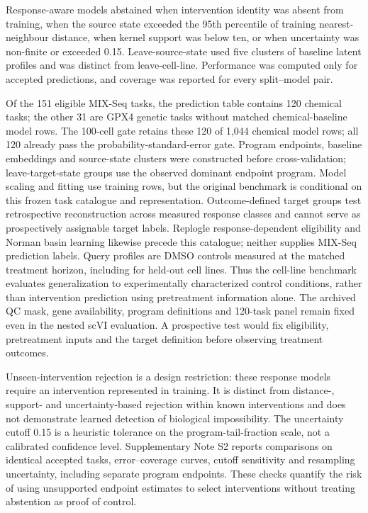 \documentclass[a4paper,fleqn]{cas-sc}
\makeatletter
\DeclareRobustCommand{\rev}[1]{{\color{red}\def\@citecolor{black}\def\@linkcolor{red}\def\@urlcolor{red}#1}}
\makeatother
\begin{document}
Response-aware models abstained when intervention identity was absent from training, when the source state exceeded the 95th percentile of training nearest-neighbour distance, when kernel support was below ten, or when uncertainty was non-finite or exceeded 0.15. Leave-source-state used five clusters of baseline latent profiles and was distinct from leave-cell-line. Performance was computed only for accepted predictions, and coverage was reported for every split--model pair.

Of the 151 eligible MIX-Seq tasks, the prediction table contains 120 chemical tasks; the other 31 are GPX4 genetic tasks without matched chemical-baseline model rows. The 100-cell gate retains these 120 of 1,044 chemical model rows; all 120 already pass the probability-standard-error gate. Program endpoints, baseline embeddings and source-state clusters were constructed before cross-validation; leave-target-state groups use the observed dominant endpoint program. Model scaling and fitting use training rows, but the original benchmark is conditional on this frozen task catalogue and representation. \rev{Outcome-defined target groups test retrospective reconstruction across measured response classes and cannot serve as prospectively assignable target labels.} Replogle response-dependent eligibility and Norman basin learning likewise precede this catalogue; neither supplies MIX-Seq prediction labels. \rev{Query profiles are DMSO controls measured at the matched treatment horizon, including for held-out cell lines.} \rev{Thus the cell-line benchmark evaluates generalization to experimentally characterized control conditions, rather than intervention prediction using pretreatment information alone.} \rev{The archived QC mask, gene availability, program definitions and 120-task panel remain fixed even in the nested scVI evaluation.} \rev{A prospective test would fix eligibility, pretreatment inputs and the target definition before observing treatment outcomes.}

Unseen-intervention rejection is a design restriction: these response models require an intervention represented in training. It is distinct from distance-, support- and uncertainty-based rejection within known interventions and does not demonstrate learned detection of biological impossibility. \rev{The uncertainty cutoff 0.15 is a heuristic tolerance on the program-tail-fraction scale, not a calibrated confidence level.} Supplementary Note S2 reports comparisons on identical accepted tasks, error--coverage curves, cutoff sensitivity and resampling uncertainty, including separate program endpoints. These checks quantify the risk of using unsupported endpoint estimates to select interventions without treating abstention as proof of control.
\end{document}
